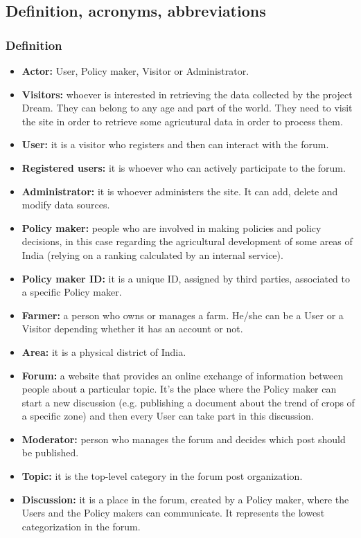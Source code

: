 \subsection{Definition, acronyms, abbreviations}
\subsubsection{Definition}
\begin{itemize}
\item \textbf{Actor:} User, Policy maker, Visitor or Administrator.
\item \textbf{Visitors:} whoever is interested in retrieving the data collected by the project Dream. They can belong to any age and part of the world. They need to visit the site in order to retrieve some agricutural data in order to process them.
\item \textbf{User:} it is a visitor who registers and then can interact with the forum.
\item \textbf{Registered users:} it is whoever who can actively participate to the forum.
\item \textbf{Administrator:} it is whoever administers the site. It can add, delete and modify data sources.
\item \textbf{Policy maker:} people who are involved in making policies and policy decisions, in this case regarding the agricultural development of some areas of India (relying on a ranking calculated by an internal service).
\item \textbf{Policy maker ID:} it is a unique ID, assigned by third parties, associated to a specific Policy maker.
\item \textbf{Farmer:} a person who owns or manages a farm. He/she can be a User or a Visitor depending whether it has an account or not.
\item \textbf{Area:} it is a physical district of India.
\item \textbf{Forum:} a website that provides an online exchange of information between people about a particular topic. It’s the place where the Policy maker can start a new discussion (e.g. publishing a document about the trend of crops of a specific zone) and then every User can take part in this discussion.
\item \textbf{Moderator:} person who manages the forum and decides which post should be published.
\item \textbf{Topic:} it is the top-level category in the forum post organization.
\item \textbf{Discussion:} it is a place in the forum, created by a Policy maker, where the Users and the Policy makers can communicate. It represents the lowest categorization in the forum.

\end{itemize}
